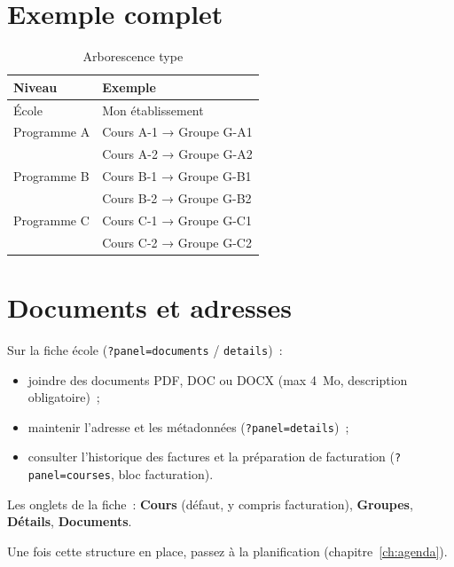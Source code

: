 \section{Exemple complet}

\begin{table}[htbp]
  \centering
  \caption{Arborescence type}
  \begin{tabular}{@{}ll@{}}
    \toprule
  \textbf{Niveau} & \textbf{Exemple} \\
    \midrule
    École & Mon établissement \\
    Programme A & Cours A-1 → Groupe G-A1 \\
                & Cours A-2 → Groupe G-A2 \\
    Programme B & Cours B-1 → Groupe G-B1 \\
                & Cours B-2 → Groupe G-B2 \\
    Programme C & Cours C-1 → Groupe G-C1 \\
                & Cours C-2 → Groupe G-C2 \\
    \bottomrule
  \end{tabular}
\end{table}

\section{Documents et adresses}

Sur la fiche école (\texttt{?panel=documents} / \texttt{details})~:

\begin{itemize}[leftmargin=*]
  \item joindre des documents PDF, DOC ou DOCX (max 4~Mo, description obligatoire)~;
  \item maintenir l'adresse et les métadonnées (\texttt{?panel=details})~;
  \item consulter l'historique des factures et la préparation de facturation (\texttt{?panel=courses}, bloc facturation).
\end{itemize}

Les onglets de la fiche~: \textbf{Cours} (défaut, y compris facturation), \textbf{Groupes}, \textbf{Détails}, \textbf{Documents}.

Une fois cette structure en place, passez à la planification (chapitre~\ref{ch:agenda}).
